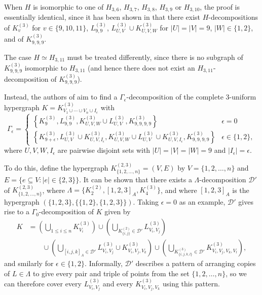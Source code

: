 When $H$ is isomorphic to one of $H_{3,6}$, $H_{3,7}$, $H_{3,8}$, $H_{3,9}$ or $H_{3,10}$, the proof is essentially identical,
since it has been shown in \cite{bryant} that there exist $H$-decompositions of $K_{v}^{(3)}$ for $v \in \{9,10,11\}$, $L_{9,9}^{(3)}$,
$L_{U,V}^{(3)} \cup K_{U,V,W}^{(3)}$ for $|U| = |V| = 9$, $|W| \in \{1,2\}$, and of $K_{9,9,9}^{(3)}$.

The case $H \simeq H_{3,11}$ must be treated differently, since there is no subgraph of $K_{9,9,9}^{(3)}$ isomorphic to $H_{3,11}$
(and hence there does not exist an $H_{3,11}$-decomposition of $K_{9,9,9}^{(3)}$).

Instead, the authors of \cite{bryant} aim to find a $\Gamma_\epsilon$-decomposition of the complete $3$-uniform hypergraph $K = K_{V_1 \cup \cdots \cup V_n \cup I_\epsilon}^{(3)}$ with
\[
    \Gamma_\epsilon =
    \begin{cases}
    \left\{ K_{9}^{(3)}, L_{9,9}^{(3)}, K_{U,V,W}^{(3)} \cup L_{U,V}^{(3)}, K_{9,9,9,9}^{(3)} \right\} & \epsilon = 0 \\
    \left\{ K_{9+\epsilon}^{(3)}, L_{U,V}^{(3)} \cup K_{U,V,I_\epsilon}^{(3)}, K_{U,V,W}^{(3)} \cup L_{U,V}^{(3)} \cup K_{U,V,I_\epsilon}^{(3)}, K_{9,9,9,9}^{(3)} \right\} & \epsilon \in \{1,2\},
    \end{cases}
\]
where $U, V, W, I_\epsilon$ are pairwise disjoint sets with $|U| = |V| = |W| = 9$ and $|I_\epsilon| = \epsilon$.

To do this, define the hypergraph $K_{\{1,2,\ldots,n\}}^{(2,3)} = (V, E)$ by $V = \{1,2,\ldots,n\}$ and $E = \{e \subseteq V : |e| \in \{2,3\}\}$.
It can be shown that there exists a $\Lambda$-decomposition $\mathcal{D}'$ of $K_{\{1,2,\ldots,n\}}^{(2,3)}$,
where $\Lambda = \{K_{2}^{(2)}, [1,2,3]_A, K_{4}^{(3)}\}$, and where $[1,2,3]_A$ is the hypergraph $(\{1,2,3\}, \{\{1,2\},\{1,2,3\}\})$.
Taking $\epsilon = 0$ as an example, $\mathcal{D}'$ gives rise to a $\Gamma_0$-decomposition of $K$ given by
\begin{align*}
    K &= \left( \bigcup_{1 \leq i \leq n} K_{V_i}^{(3)} \right)
    \cup \left( \bigcup_{K_{\{i,j\}}^{(2)} \in \mathcal{D}'} L_{V_i,V_j}^{(3)} \right)
    \\ & \quad \quad
    \cup \left( \bigcup_{[i,j,k]_A \in \mathcal{D}'} L_{V_i,V_j}^{(3)} \cup K_{V_i,V_j,V_k}^{(3)} \right)
    \cup \left( \bigcup_{K_{\{i,j,k,l\}}^{(3)} \in \mathcal{D}'} K_{V_i,V_j,V_k,V_l}^{(3)} \right),
\end{align*}
and smilarly for $\epsilon \in \{1,2\}$.
Informally, $\mathcal{D}'$ describes a pattern of arranging copies of $L \in \Lambda$ to give every pair and triple of points from the set $\{1,2,\ldots,n\}$,
so we can therefore cover every $L_{V_i, V_j}^{(3)}$ and every $K_{V_i, V_j, V_k}^{(3)}$ using this pattern.

